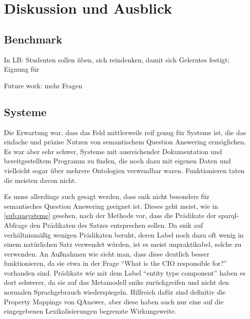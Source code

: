 \chapter{Diskussion und Ausblick}\label{ch:discussion}

\section{Benchmark}

In LB: Studenten sollen üben, sich reindenken, damit sich Gelerntes festigt; Eignung für

Future work: mehr Fragen

\section{Systeme}

Die Erwartung war, dass das Feld mittlerweile reif genug für Systeme ist, die das einfache und präzise Nutzen von semantischem Question Answering ermöglichen.
Es war aber sehr schwer, Systeme mit ausreichender Dokumentation und bereitgestelltem Programm zu finden, die noch dazu mit eigenen Daten und vielleicht sogar über mehrere Ontologien verwendbar waren.
Funktionieren taten die meisten davon nicht.

Es muss allerdings auch gesagt werden, dass \ac{snik} nicht besonders für semantisches Question Answering geeignet ist.
Dieses geht meist, wie in \cref{sub:qasysteme} gesehen, nach der Methode vor, dass die Prädikate der \ac{sparql}-Abfrage den Prädikaten des Satzes entsprechen sollen.
Da \ac{snik} auf verhältnismäßig wenigen Prädikaten beruht, deren Label noch dazu oft wenig in einem natürlichen Satz verwendet würden, ist es meist unpraktikabel, solche zu verwenden.
An Außnahmen wie  sieht man, dass diese deutlich besser funktionieren, da sie etwa in der Frage \enquote{What is the CIO responsible for?} vorhanden sind.
Prädikate wie  mit dem Label \enquote{entity type component} haben es dort schwerer, da sie auf das Metamodell \ac{snik}s zurückgreifen
und nicht den normalen Sprachgebrauch wiederspiegeln.
Hilfreich dafür sind definitiv die Property Mappings von QAnswer, aber diese haben auch nur eine auf die eingegebenen Lexikalisierungen begrenzte Wirkungsweite.

